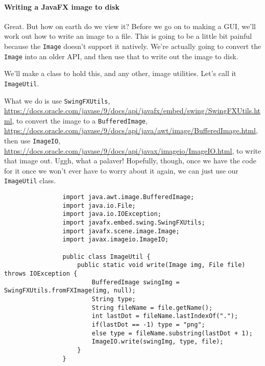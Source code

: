 \documentclass{article}
\begin{document}
        \newpage
        \paragraph{Writing a JavaFX image to disk} 
            Great. But how on earth do we view it? Before we go on to making a GUI, we'll work out how to write an image to a file. This is
            going to be a little bit painful because the \texttt{Image} doesn't support it natively. We're actually going to convert the
            \texttt{Image} into an older API, and then use that to write out the image to disk.
        
            We'll make a class to hold this, and any other, image utilities.  Let's call it \texttt{ImageUtil}.
        
            What we do is use \texttt{SwingFXUtils}, \url{https://docs.oracle.com/javase/9/docs/api/javafx/embed/swing/SwingFXUtils.html},
            to convert the image to a \texttt{BufferedImage},
            \url{https://docs.oracle.com/javase/9/docs/api/java/awt/image/BufferedImage.html}, then use \texttt{ImageIO},
            \url{https://docs.oracle.com/javase/9/docs/api/javax/imageio/ImageIO.html}, to write that image out. Uggh, what a palaver!
            Hopefully, though, once we have the code for it once we won't ever have to worry about it again, we can just use our
            \texttt{ImageUtil} class.
        
            \begin{verbatim}
                import java.awt.image.BufferedImage;
                import java.io.File;
                import java.io.IOException;
                import javafx.embed.swing.SwingFXUtils;
                import javafx.scene.image.Image;
                import javax.imageio.ImageIO;

                public class ImageUtil {
                    public static void write(Image img, File file) throws IOException {
                        BufferedImage swingImg = SwingFXUtils.fromFXImage(img, null);
                        String type;
                        String fileName = file.getName();
                        int lastDot = fileName.lastIndexOf(".");
                        if(lastDot == -1) type = "png";
                        else type = fileName.substring(lastDot + 1);
                        ImageIO.write(swingImg, type, file);
                    }
                }
            \end{verbatim}
        
\end{document}
